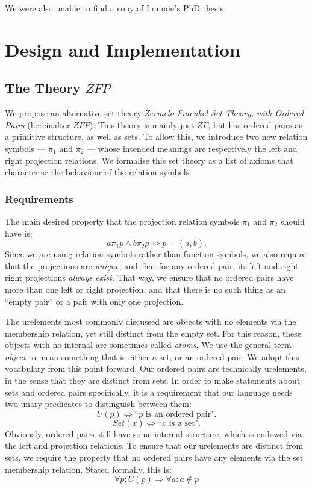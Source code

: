 \documentclass[11pt]{report}
\newcommand{\pleft}{\mathrel{\pi_1}}
\newcommand{\pright}{\mathrel{\pi_2}}
\theoremstyle{definition}
\theoremstyle{theorem}
\theoremstyle{lemma}
\begin{document}
We were also unable to find a copy of Lunnon's PhD thesis.

\chapter{Design and Implementation}
\section{The Theory $\mathit{ZFP}$}
We propose an alternative set theory \emph{Zermelo-Fraenkel Set Theory, with Ordered Pairs} (hereinafter $\mathit{ZFP}$).
This theory is mainly just $\mathit{ZF}$, but has ordered pairs as a primitive structure, as well as sets.
To allow this, we introduce two new relation symbols --- $\pleft$ and $\pright$ --- whose intended meanings are respectively the left and right projection relations.
We formalise this set theory as a list of axioms that characterise the behaviour of the relation symbols. 

\subsection{Requirements}\label{zfpreq}
The main desired property that the projection relation symbols $\pleft$ and $\pright$ should have is:
$$a\pleft p \wedge b\pright p \iff p = (a,b).$$ 
Since we are using relation symbols rather than function symbols, we also require that the projections are \emph{unique}, and that for any ordered pair, its left and right right projections \emph{always exist}.
That way, we ensure that no ordered pairs have more than one left or right projection, and that there is no such thing as an ``empty pair'' or a pair with only one projection. 

The urelements most commonly discussed are objects with no elements via the membership relation, yet still distinct from the empty set.
For this reason, these objects with no internal are sometimes called \emph{atoms}. 
We use the general term \emph{object} to mean something that is either a set, or an ordered pair.
We adopt this vocabulary from this point forward.
Our ordered pairs are technically urelements, in the sense that they are distinct from sets.
In order to make statements about sets and ordered pairs specifically, it is a requirement that our language needs two unary predicates to distinguish between them: 
$$U(p) \iff \text{``$p$ is an ordered pair".}$$
$$Set(x) \iff \text{``$x$ is a set".}$$
Obviously, ordered pairs still have some internal structure, which is endowed via the left and projection relations.
To ensure that our urelements are distinct from sets, we require the property that no ordered pairs have any elements via the set membership relation.
Stated formally, this is: 
$$\forall p: U(p) \Rightarrow \forall a: a\notin p$$
\end{document}
